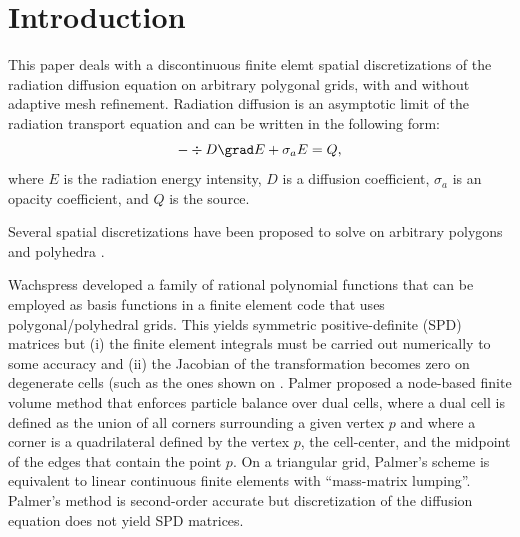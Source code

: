 \section{Introduction} \label{sec_intro}

This paper deals with a discontinuous finite elemt spatial discretizations of the radiation 
diffusion equation on arbitrary polygonal grids, with and without adaptive mesh refinement. 
Radiation diffusion is an asymptotic limit of the radiation transport equation and can be 
written in the following form:
\begin{equation} \label{eq:radiation_diffusion}
- \div  D \grad E + \sigma_a E = Q ,
\end{equation}
where $E$ is the radiation energy intensity, $D$ is a diffusion coefficient, $\sigma_a$ is 
an opacity coefficient, and $Q$ is the source.

Several spatial discretizations have been proposed to solve  on
arbitrary polygons and polyhedra \cite{Wachspress,PalmerLLNL,Palmer2005,MorelHall,MorelShashkov,%
BaileyAdams2008,KutnetsovMimetic}. 

Wachspress \cite{Wachspress} developed a family of rational polynomial functions that can be employed
as basis functions in a finite element code that uses polygonal/polyhedral grids. This yields
symmetric positive-definite (SPD) matrices but (i) the finite element integrals must be carried out 
numerically to some accuracy and (ii) the Jacobian of the transformation becomes zero on degenerate 
cells (such as the ones shown on . Palmer \cite{PalmerLLNL,Palmer2005}
proposed a node-based finite volume method that enforces particle balance over dual cells,
where a dual cell is defined as the union of all corners surrounding a given vertex $p$ and where  
a corner is a quadrilateral defined by the vertex $p$, the cell-center, and the midpoint
of the edges that contain the point $p$. On a triangular grid, Palmer's scheme is equivalent 
to linear continuous finite elements with ``mass-matrix lumping''. Palmer's method is 
second-order accurate but discretization of the diffusion equation does not yield SPD matrices.






